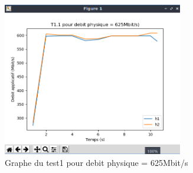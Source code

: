 \begin{figure}[H]
    \centering
    \includegraphics[width=0.7\textwidth]{./images/T1.1/courbe625test1.png}
    \caption{Graphe du test1 pour debit physique = 625Mbit/s}
    \label{fig:exemple}
\end{figure}

